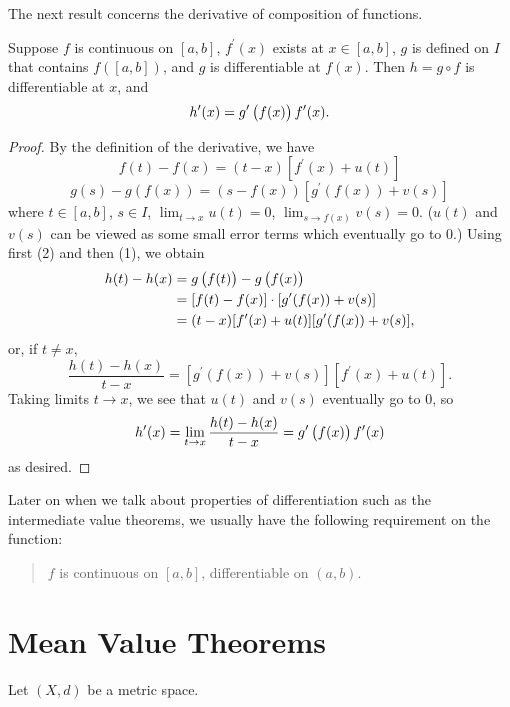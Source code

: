 The next result concerns the derivative of composition of functions.

\begin{lemma}\label{lemma:chain-rule}
Suppose $f$ is continuous on $[a,b]$, $f^\prime(x)$ exists at $x\in[a,b]$, $g$ is defined on $I$ that contains $f([a,b])$, and $g$ is differentiable at $f(x)$. Then $h=g\circ f$ is differentiable at $x$, and
\begin{equation}
h^\prime(x)=g^\prime\left(f(x)\right)f^\prime(x).
\end{equation}
\end{lemma}

\begin{proof}
By the definition of the derivative, we have
\begin{equation*}\tag{1}
f(t)-f(x)=(t-x)[f^\prime(x)+u(t)]
\end{equation*}
\begin{equation*}\tag{2}
g(s)-g(f(x))=(s-f(x))[g^\prime(f(x))+v(s)]
\end{equation*}
where $t\in[a,b]$, $s\in I$, $\displaystyle\lim_{t\to x}u(t)=0$, $\displaystyle\lim_{s\to f(x)}v(s)=0$. ($u(t)$ and $v(s)$ can be viewed as some small error terms which eventually go to $0$.) Using first (2) and then (1), we obtain
\begin{align*}
h(t)-h(x)
&=g\left(f(t)\right)-g\left(f(x)\right)\\
&=[f(t)-f(x)]\cdot[g^\prime(f(x))+v(s)]\\
&=(t-x)[f^\prime(x)+u(t)][g^\prime(f(x))+v(s)],
\end{align*}
or, if $t\neq x$,
\[\frac{h(t)-h(x)}{t-x}=[g^\prime(f(x))+v(s)][f^\prime(x)+u(t)].\]
Taking limits $t\to x$, we see that $u(t)$ and $v(s)$ eventually go to $0$, so
\[h^\prime(x)=\lim_{t\to x}\frac{h(t)-h(x)}{t-x}=g^\prime\left(f(x)\right)f^\prime(x)\]
as desired.
\end{proof}

Later on when we talk about properties of differentiation such as the intermediate value theorems, we usually have the following requirement on the function:
\begin{quote}
$f$ is continuous on $[a,b]$, differentiable on $(a,b)$.
\end{quote}
\pagebreak

\section{Mean Value Theorems}
Let $(X,d)$ be a metric space.

